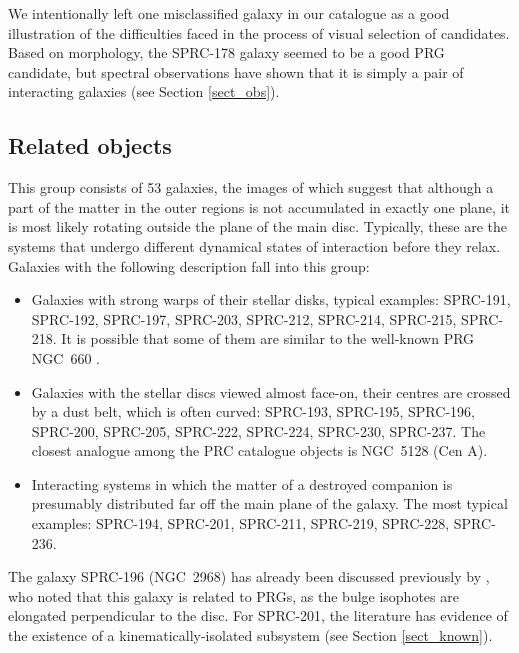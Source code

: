 \documentclass[useAMS,usenatbib]{mn2e}
\begin{document}
We intentionally left  one misclassified  galaxy in our catalogue as a good
illustration of the difficulties faced in the process of visual
selection of candidates. Based on morphology, the SPRC-178 galaxy
seemed to be a good PRG candidate, but spectral observations have
shown that it is simply a pair of interacting galaxies (see
Section \ref{sect_obs}).




\subsection{Related objects}

This group consists of  53 galaxies, the images of which suggest
that although a part of the matter in the outer regions  is not
accumulated in exactly one plane, it is most likely rotating
outside the plane of the main disc.  Typically, these are the
systems that undergo different dynamical states of  interaction
before they relax. Galaxies with  the following description fall into
this group:


\begin{itemize}
\item Galaxies with strong warps of their stellar disks, typical examples:
SPRC-191, SPRC-192, SPRC-197, SPRC-203, SPRC-212, SPRC-214,
SPRC-215, SPRC-218. It is possible that some of them are similar
to the well-known PRG NGC~660 \citep{vanDriel1995}.

\item Galaxies with the stellar discs viewed almost face-on,
their centres are crossed by a dust belt, which is often curved:
SPRC-193, SPRC-195,  SPRC-196, SPRC-200, SPRC-205, SPRC-222,
SPRC-224, SPRC-230, SPRC-237. The closest analogue among the PRC
catalogue  objects is NGC~5128 (Cen A).

\item Interacting systems in which the matter of a destroyed
companion is presumably distributed far off the main plane of the galaxy. The
most typical examples: SPRC-194, SPRC-201, SPRC-211, SPRC-219,
SPRC-228, SPRC-236.
\end{itemize}

The galaxy SPRC-196 (NGC~2968) has already been discussed
previously by \citet{Sarzi00}, who noted that this galaxy is
related to PRGs, as the bulge isophotes are elongated
perpendicular to the disc. For SPRC-201, the literature has
evidence of the existence of a kinematically-isolated subsystem
(see Section \ref{sect_known}).
\end{document}
